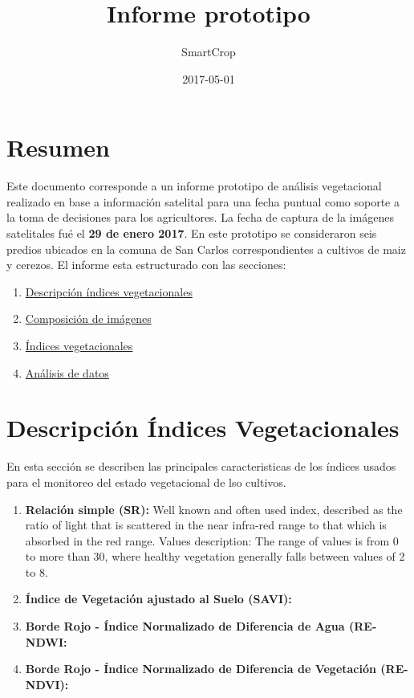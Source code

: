 \documentclass[]{report}
\title{Informe prototipo}
\author{SmartCrop}
\date{2017-05-01}
\providecommand{\tightlist}{%
  \setlength{\itemsep}{0pt}\setlength{\parskip}{0pt}}
\begin{document}
\maketitle

{
\setcounter{tocdepth}{1}
\tableofcontents
}
\chapter{Resumen}\label{resumen}

Este documento corresponde a un informe prototipo de análisis
vegetacional realizado en base a información satelital para una fecha
puntual como soporte a la toma de decisiones para los agricultores. La
fecha de captura de la imágenes satelitales fué el \textbf{29 de enero
2017}. En este prototipo se consideraron seis predios ubicados en la
comuna de San Carlos correspondientes a cultivos de maiz y cerezos. El
informe esta estructurado con las secciones:

\begin{enumerate}
\def\labelenumi{\arabic{enumi}.}
\tightlist
\item
  \protect\hyperlink{DescripcionVIs}{Descripción índices vegetacionales}
\item
  \protect\hyperlink{DescipcionVIs}{Composición de imágenes}
\item
  \protect\hyperlink{indicesVeg}{Índices vegetacionales}
\item
  \protect\hyperlink{AnalisisDatos}{Análisis de datos}
\end{enumerate}

\hypertarget{DescripcionVIs}{\chapter{Descripción Índices
Vegetacionales}\label{DescripcionVIs}}

En esta sección se describen las principales caracteristicas de los
índices usados para el monitoreo del estado vegetacional de lso
cultivos.

\begin{enumerate}
\def\labelenumi{\arabic{enumi}.}
\item
  \textbf{Relación simple (SR):} Well known and often used index,
  described as the ratio of light that is scattered in the near
  infra-red range to that which is absorbed in the red range. Values
  description: The range of values is from 0 to more than 30, where
  healthy vegetation generally falls between values of 2 to 8.
\item
  \textbf{Índice de Vegetación ajustado al Suelo (SAVI):}
\item
  \textbf{Borde Rojo - Índice Normalizado de Diferencia de Agua
  (RE-NDWI:}
\item
  \textbf{Borde Rojo - Índice Normalizado de Diferencia de Vegetación
  (RE-NDVI):}
\end{enumerate}
\end{document}
